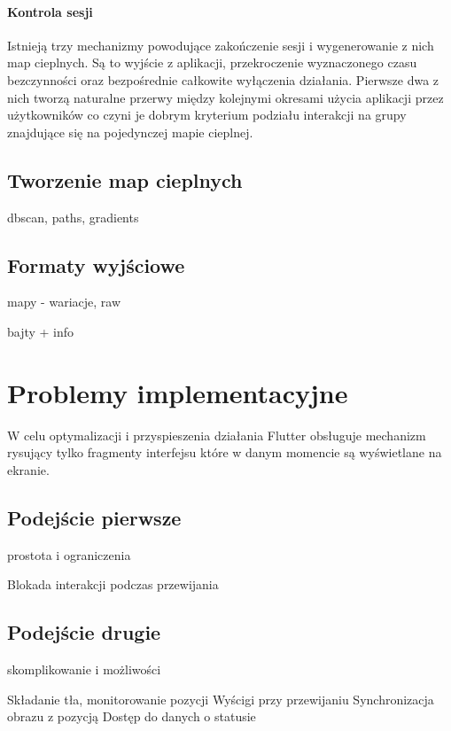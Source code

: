 
\paragraph{Kontrola sesji}
Istnieją trzy mechanizmy powodujące zakończenie sesji i wygenerowanie z nich map cieplnych. Są to wyjście z aplikacji, przekroczenie wyznaczonego czasu bezczynności oraz bezpośrednie całkowite wyłączenia działania. Pierwsze dwa z nich tworzą naturalne przerwy między kolejnymi okresami użycia aplikacji przez użytkowników co czyni je dobrym kryterium podziału interakcji na grupy znajdujące się na pojedynczej mapie cieplnej.

\subsection{Tworzenie map cieplnych}
dbscan, paths, gradients

\subsection{Formaty wyjściowe}
mapy - wariacje, raw

bajty + info

\section{Problemy implementacyjne}
W celu optymalizacji i przyspieszenia działania Flutter obsługuje mechanizm rysujący tylko fragmenty interfejsu które w danym momencie są wyświetlane na ekranie.

\subsection{Podejście pierwsze}
prostota i ograniczenia

Blokada interakcji podczas przewijania

\subsection{Podejście drugie}
skomplikowanie i możliwości

Składanie tła, monitorowanie pozycji
Wyścigi przy przewijaniu
Synchronizacja obrazu z pozycją
Dostęp do danych o statusie
